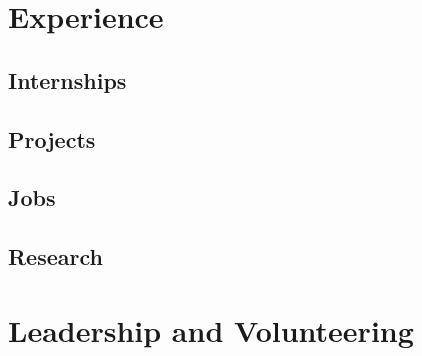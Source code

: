 \documentclass[letterpaper, 11pt]{moderncv}
\begin{document}
	\begin{resume}
		\section{Experience}
			\subsection{\textbf{Internships}}
				
			\subsection{\textbf{Projects}}
				
			\subsection{\textbf{Jobs}}
				
			\subsection{\textbf{Research}}
				
				
		\section{Leadership and Volunteering}
			
	\end{resume}
\end{document}
